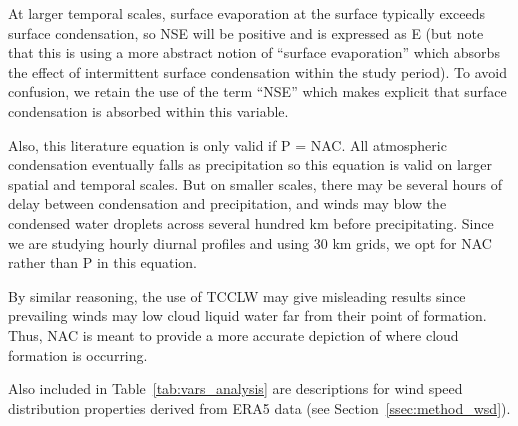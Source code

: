 At larger temporal scales, surface evaporation at the surface typically exceeds surface condensation, so \ac{NSE} will be positive and is expressed as E (but note that this is using a more abstract notion of “surface evaporation” which absorbs the effect of intermittent surface condensation within the study period). To avoid confusion, we retain the use of the term “NSE” which makes explicit that surface condensation is absorbed within this variable. 

Also, this literature equation is only valid if P = NAC. All atmospheric condensation eventually falls as precipitation so this equation is valid on larger spatial and temporal scales. But on smaller scales, there may be several hours of delay between condensation and precipitation, and winds may blow the condensed water droplets across several hundred km before precipitating. Since we are studying hourly diurnal profiles and using 30 km grids, we opt for \ac{NAC} rather than P in this equation.

By similar reasoning, the use of \ac{TCCLW} may give misleading results since prevailing winds may low cloud liquid water far from their point of formation. Thus, \ac{NAC} is meant to provide a more accurate depiction of where cloud formation is occurring.

Also included in Table~\ref{tab:vars_analysis} are descriptions for wind speed distribution properties derived from \ac{ERA5} data (see Section~\ref{ssec:method_wsd}).

